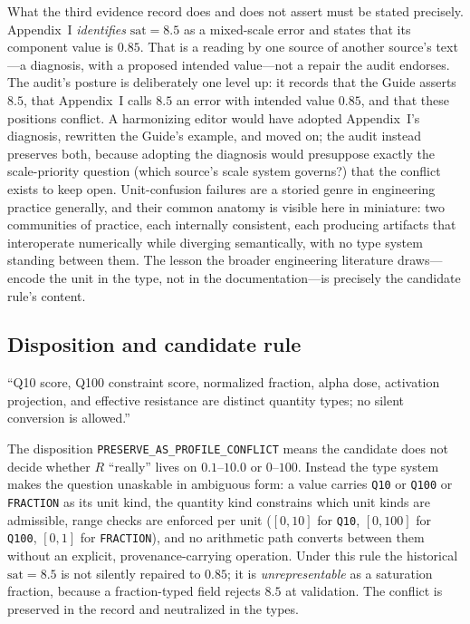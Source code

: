 What the third evidence record does and does not assert must be stated
precisely. Appendix~I \emph{identifies} $\mathrm{sat}=8.5$ as a mixed-scale
error and states that its component value is $0.85$. That is a reading by one
source of another source's text---a diagnosis, with a proposed intended
value---not a repair the audit endorses. The audit's posture is deliberately
one level up: it records that the Guide asserts $8.5$, that Appendix~I calls
$8.5$ an error with intended value $0.85$, and that these positions
conflict. A harmonizing editor would have adopted Appendix~I's diagnosis,
rewritten the Guide's example, and moved on; the audit instead preserves
both, because adopting the diagnosis would presuppose exactly the
scale-priority question (which source's scale system governs?) that the
conflict exists to keep open. Unit-confusion failures are a storied genre in
engineering practice generally, and their common anatomy is visible here in
miniature: two communities of practice, each internally consistent, each
producing artifacts that interoperate numerically while diverging
semantically, with no type system standing between them. The lesson the
broader engineering literature draws---encode the unit in the type, not in
the documentation---is precisely the candidate rule's content.

\subsection{Disposition and candidate rule}

\begin{ruleenv}\label{ch04:rule:scale}
``Q10 score, Q100 constraint score, normalized fraction, alpha dose,
activation projection, and effective resistance are distinct quantity types;
no silent conversion is allowed.''
\end{ruleenv}

The disposition \texttt{PRESERVE\_AS\_PROFILE\_CONFLICT} means the candidate
does not decide whether $R$ ``really'' lives on $0.1$--$10.0$ or $0$--$100$.
Instead the type system makes the question unaskable in ambiguous form: a
value carries \texttt{Q10} or \texttt{Q100} or \texttt{FRACTION} as its unit
kind, the quantity kind constrains which unit kinds are admissible, range
checks are enforced per unit ($[0,10]$ for \texttt{Q10}, $[0,100]$ for
\texttt{Q100}, $[0,1]$ for \texttt{FRACTION}), and no arithmetic path
converts between them without an explicit, provenance-carrying operation.
Under this rule the historical $\mathrm{sat}=8.5$ is not silently repaired to
$0.85$; it is \emph{unrepresentable} as a saturation fraction, because a
fraction-typed field rejects $8.5$ at validation. The conflict is preserved
in the record and neutralized in the types.

